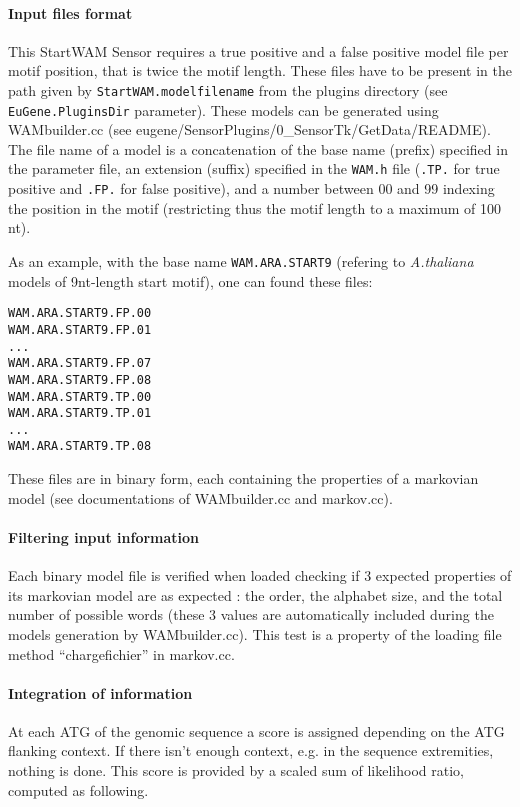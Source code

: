 \paragraph{Input files format}

This StartWAM Sensor requires a true positive and a false positive
model file per motif position, that is twice the motif length. These
files have to be present in the path given by
\texttt{StartWAM.modelfilename} from the plugins directory (see
\texttt{EuGene.PluginsDir} parameter). These models can be generated
using WAMbuilder.cc (see
eugene/SensorPlugins/0\_SensorTk/GetData/README).  The file name of
a model is a concatenation of the base name (prefix) specified in the
parameter file, an extension (suffix) specified in the \texttt{WAM.h}
file (\texttt{.TP.} for true positive and \texttt{.FP.}  for false
positive), and a number between 00 and 99 indexing the position in the
motif (restricting thus the motif length to a maximum of 100 nt).

As an example, with the base name \texttt{WAM.ARA.START9} (refering to
{\em A.thaliana} models of 9nt-length start motif), one can found these files:
\begin{Verbatim}[fontsize=\small]
WAM.ARA.START9.FP.00
WAM.ARA.START9.FP.01
...
WAM.ARA.START9.FP.07
WAM.ARA.START9.FP.08
WAM.ARA.START9.TP.00
WAM.ARA.START9.TP.01
...
WAM.ARA.START9.TP.08
\end{Verbatim}

These files are in binary form, each containing the properties of a
markovian model (see documentations of WAMbuilder.cc and markov.cc).

\paragraph{Filtering input information}

Each binary model file is verified when loaded checking if 3 expected
properties of its markovian model are as expected : the order, the
alphabet size, and the total number of possible words (these 3 values
are automatically included during the models generation by
WAMbuilder.cc). This test is a property of the loading file method
``chargefichier'' in markov.cc.

\paragraph{Integration of information}

At each ATG of the genomic sequence a score is assigned depending on
the ATG flanking context. If there isn't enough context, e.g. in the
sequence extremities, nothing is done.  This score is provided by a
scaled sum of likelihood ratio, computed as following.

